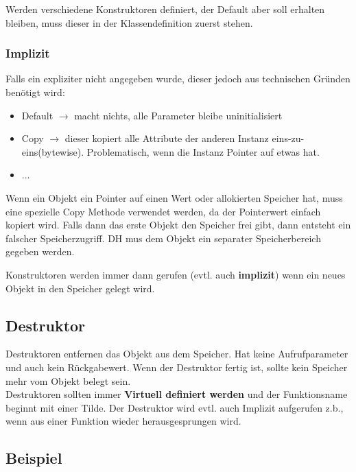 Werden verschiedene Konstruktoren definiert, der Default aber soll erhalten bleiben, muss dieser in der Klassendefinition zuerst stehen.\\


\subsubsection{Implizit}

Falls ein expliziter nicht angegeben wurde, dieser jedoch aus technischen Gründen benötigt wird:

\begin{itemize}[itemsep=1pt, parsep=0pt]
    \item Default $\rightarrow$ macht nichts, alle Parameter bleibe uninitialisiert
    \item Copy $\rightarrow$ dieser kopiert alle Attribute der anderen Instanz eins-zu-eins(bytewise). Problematisch, wenn die Instanz Pointer auf etwas hat.
    \item ...
\end{itemize}

Wenn ein Objekt ein Pointer auf einen Wert oder allokierten Speicher hat, muss eine spezielle Copy Methode verwendet werden, da der Pointerwert einfach kopiert wird.
Falls dann das erste Objekt den Speicher frei gibt, dann entsteht ein falscher Speicherzugriff.
DH mus dem Objekt ein separater Speicherbereich gegeben werden. 

Konstruktoren werden immer dann gerufen (evtl. auch \textbf{implizit}) wenn ein neues Objekt in den Speicher gelegt wird.\\

\subsection{Destruktor}

Destruktoren entfernen das Objekt aus dem Speicher. 
Hat keine Aufrufparameter und auch kein Rückgabewert.
Wenn der Destruktor fertig ist, sollte kein Speicher mehr vom Objekt belegt sein.\\
Destruktoren sollten immer \textbf{Virtuell definiert werden} und der Funktionsname beginnt mit einer Tilde. 
Der Destruktor wird evtl. auch Implizit aufgerufen z.b., wenn aus einer Funktion wieder herausgesprungen wird. 

\subsection{Beispiel}

